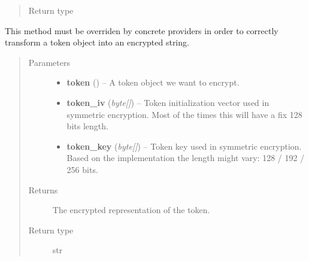 \documentclass[letterpaper,10pt,english]{sphinxmanual}
\begin{document}
\begin{fulllineitems}
\begin{fulllineitems}
\begin{quote}
\begin{description}
\item[{Return type}] \leavevmode
{\hyperref[features/oauth2/technical_summary:fantastico.oauth2.token.Token]{}}

\end{description}\end{quote}

\end{fulllineitems}


\begin{fulllineitems}
\label{features/oauth2/technical_summary:fantastico.oauth2.token_encryption.TokenEncryption.encrypt_token}
This method must be overriden by concrete providers in order to correctly transform a token object into an encrypted
string.
\begin{quote}\begin{description}
\item[{Parameters}] \leavevmode\begin{itemize}
\item {} 
\textbf{token} ({\hyperref[features/oauth2/technical_summary:fantastico.oauth2.token.Token]{}}) -- A token object we want to encrypt.

\item {} 
\textbf{token\_iv} (\emph{byte{[}{]}}) -- Token initialization vector used in symmetric encryption. Most of the times this will have a fix 128 bits length.

\item {} 
\textbf{token\_key} (\emph{byte{[}{]}}) -- Token key used in symmetric encryption. Based on the implementation the length might vary: 128 / 192 / 256 bits.

\end{itemize}

\item[{Returns}] \leavevmode
The encrypted representation of the token.

\item[{Return type}] \leavevmode
str

\end{description}\end{quote}

\end{fulllineitems}


\end{fulllineitems}
\end{document}
